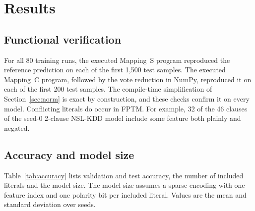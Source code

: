 \documentclass[preprint,review,12pt]{elsarticle}
\begin{document}
\section{Results}\label{sec:results}

\subsection{Functional verification}
For all 80 training runs, the executed Mapping~S program reproduced the reference prediction on each of the first 1,500 test samples.
The executed Mapping~C program, followed by the vote reduction in NumPy, reproduced it on each of the first 200 test samples.
The compile-time simplification of Section~\ref{sec:norm} is exact by construction, and these checks confirm it on every model.
Conflicting literals do occur in FPTM. For example, 32 of the 46 clauses of the seed-0 2-clause NSL-KDD model include some feature both plainly and negated.

\subsection{Accuracy and model size}\label{sec:accuracy}
Table~\ref{tab:accuracy} lists validation and test accuracy, the number of included literals and the model size.
The model size assumes a sparse encoding with one feature index and one polarity bit per included literal.
Values are the mean and standard deviation over seeds.
\end{document}
